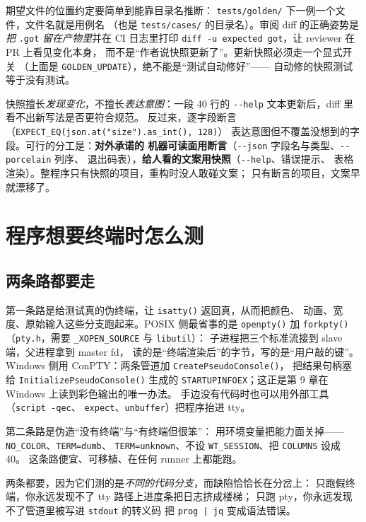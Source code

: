\documentclass[12pt,a4paper,fontset=fandol]{ctexbook}
\newcommand{\Fn}[1]{\texttt{#1()}}
\newcommand{\Tp}[1]{\texttt{#1}}
\newcommand{\Opt}[1]{\texttt{-\/-#1}}
\newcommand{\Bk}{\allowbreak}
\begin{document}
期望文件的位置约定要简单到能靠目录名推断：
\Tp{tests/golden/} 下一例一个文件，文件名就是用例名
（也是 \Tp{tests/cases/} 的目录名）。审阅 diff 的正确姿势是
\emph{把} \lstinline|.got| \emph{留在产物里}并在 CI 日志里打印
\lstinline|diff -u expected got|，让 reviewer 在 PR 上看见变化本身，
而不是``作者说快照更新了''。更新快照必须走一个显式开关
（上面是 \Tp{GOLDEN\Bk\_UPDATE}），绝不能是``测试自动修好''——
自动修的快照测试等于没有测试。

\begin{warning}[title={快照与断言的分工，别搞反}]
快照擅长\emph{发现变化}，不擅长\emph{表达意图}：一段 40 行的
\Opt{help} 文本更新后，diff 里看不出新写法是否更符合规范。
反过来，逐字段断言（\lstinline+EXPECT_EQ(json.at("size").as_int(), 128)+）
表达意图但不覆盖没想到的字段。可行的分工是：\textbf{对外承诺的
机器可读面用断言}（\Opt{json} 字段名与类型、\Opt{porcelain} 列序、
退出码表），\textbf{给人看的文案用快照}（\Opt{help}、错误提示、
表格渲染）。整程序只有快照的项目，重构时没人敢碰文案；
只有断言的项目，文案早就漂移了。
\end{warning}

\section{程序想要终端时怎么测}

\subsection{两条路都要走}

第一条路是给测试真的伪终端，让 \Fn{isatty} 返回真，从而把颜色、
动画、宽度、原始输入这些分支跑起来。POSIX 侧最省事的是
\Fn{openpty} 加 \Fn{forkpty}（\Tp{pty.h}，需要
\lstinline|_XOPEN_SOURCE| 与 \Tp{libutil}）：
子进程把三个标准流接到 slave 端，父进程拿到 master fd，
读的是``终端渲染后''的字节，写的是``用户敲的键''。
Windows 侧用 ConPTY：两条管道加 \Fn{CreatePseudoConsole}，
把结果句柄塞给 \Fn{InitializePseudoConsole} 生成的
\Tp{STARTUPINFOEX}；这正是第 9 章在 Windows 上读到彩色输出的唯一办法。
手边没有代码时也可以用外部工具（\Tp{script -qec}、
\Tp{expect}、\Tp{unbuffer}）把程序抬进 tty。

第二条路是伪造``没有终端''与``有终端但很笨''：
用环境变量把能力面关掉——\Tp{NO\_COLOR}、\Tp{TERM=dumb}、
\Tp{TERM=unknown}、不设 \Tp{WT\_SESSION}、把 \Tp{COLUMNS} 设成 40。
这条路便宜、可移植、在任何 runner 上都能跑。

两条都要，因为它们测的是\emph{不同的代码分支}，而缺陷恰恰长在分岔上：
只跑假终端，你永远发现不了 tty 路径上进度条把日志挤成楼梯；
只跑 pty，你永远发现不了管道里被写进 \Tp{stdout} 的转义码
把 \Tp{prog | jq} 变成语法错误。
\end{document}
